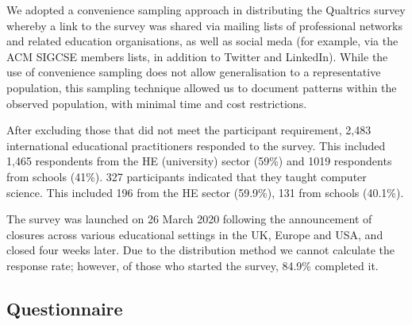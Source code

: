 \documentclass[conference]{IEEEtran}
\begin{document}
We adopted a convenience sampling approach in distributing the
Qualtrics survey whereby a link to the survey was shared via mailing
lists of professional networks and related education organisations, as
well as social meda (for example, via the ACM SIGCSE members lists, in
addition to Twitter and LinkedIn). While the use of convenience
sampling does not allow generalisation to a representative population,
this sampling technique allowed us to document patterns within the
observed population, with minimal time and cost restrictions.


After excluding those that did not meet the participant requirement,
2,483 international educational practitioners responded to the
survey. This included 1,465 respondents from the HE (university)
sector (59\%) and 1019 respondents from schools (41\%). 327
participants indicated that they taught computer science. This
included 196 from the HE sector (59.9\%), 131 from schools (40.1\%).


The survey was launched on 26 March 2020 following the announcement of
closures across various educational settings in the UK, Europe and
USA, and closed four weeks later. Due to the distribution method we
cannot calculate the response rate; however, of those who started the
survey, 84.9\% completed it.

\subsection{Questionnaire}
\end{document}
